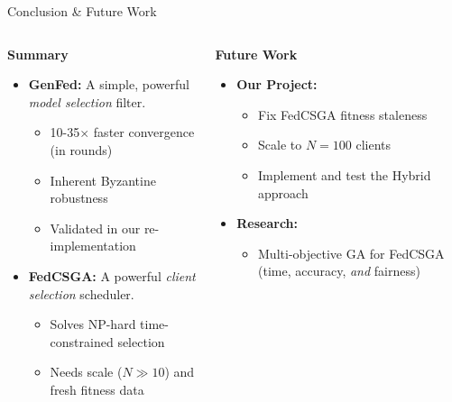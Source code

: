 \documentclass{beamer}
\begin{document}
\begin{frame}{Conclusion \& Future Work}
\begin{columns}[T]
\begin{column}{0.48\textwidth}
\textbf{Summary}
\begin{itemize}
    \item \textbf{GenFed:} A simple, powerful \textit{model selection} filter.
    \begin{itemize} \scriptsize
        \item 10-35$\times$ faster convergence (in rounds)
        \item Inherent Byzantine robustness
        \item Validated in our re-implementation
    \end{itemize}
    \item \textbf{FedCSGA:} A powerful \textit{client selection} scheduler.
    \begin{itemize} \scriptsize
        \item Solves NP-hard time-constrained selection
        \item Needs scale ($N \gg 10$) and fresh fitness data
    \end{itemize}
    
\end{itemize}
\end{column}

\begin{column}{0.48\textwidth}
\textbf{Future Work}
\begin{itemize}
    \item \textbf{Our Project:}
    \begin{itemize} \scriptsize
        \item Fix FedCSGA fitness staleness
        \item Scale to $N=100$ clients
        \item Implement and test the Hybrid approach
    \end{itemize}
    \item \textbf{Research:}
    \begin{itemize} \scriptsize
        \item Multi-objective GA for FedCSGA (time, accuracy, \textit{and} fairness)
    \end{itemize}
\end{itemize}
\end{column}
\end{columns}
\end{frame}
\end{document}
